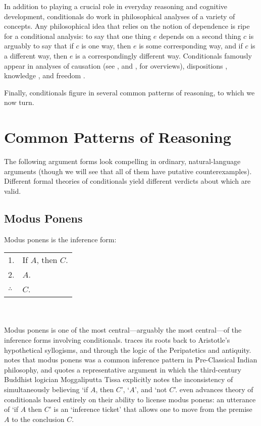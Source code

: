 In addition to playing a crucial role in everyday reasoning and cognitive development, conditionals do work in philosophical analyses of a variety of concepts.  Any philosophical idea that relies on the notion of dependence is ripe for a conditional analysis: to say that one thing $e$ depends on a second thing $c$ is arguably to say that if $c$ is one way, then $e$ is some corresponding way, and if $c$ is a different way, then $e$ is a correspondingly different way.  Conditionals famously appear in analyses of causation (see \citealp{menzies-sep}, and \citealp{Collins2004-COLCAC-2}, for overviews), dispositions \citep{prior-pargetter-jackson, choi-simple-reformed, choi-conditional-dispositions}, knowledge \citep{nozick-knowledge, sosa-moore}, and freedom \citep{moore-ethics, ayer-freedom}.

Finally, conditionals figure in several common patterns of reasoning, to which we now turn.

\section{Common Patterns of Reasoning}
\label{reasoning-patterns}

The following argument forms look compelling in ordinary, natural-language arguments (though we will see that all of them have putative counterexamples).  Different formal theories of conditionals yield different verdicts about which are valid.

\subsection{Modus Ponens}

Modus ponens is the inference form:\smallskip\\
\begin{tabular}{ll}
1. & If $A$, then $C$.\\
2. &$A$.\\
\hline
$\therefore$ & $C$.
\end{tabular}\\\smallskip\\
Modus ponens is one of the most central---arguably the most central---of the inference forms involving conditionals. \citet{Bobzien2002-BOBTDO-2} traces its roots back to Aristotle's hypothetical syllogisms, and through the logic of the Peripatetics and antiquity. \citet{sep-logic-india} notes that modus ponens was a common inference pattern in Pre-Classical Indian philosophy, and quotes a representative argument in which the third-century Buddhist logician Moggaliputta Tissa explicitly notes the inconsistency of simultaneously believing `if $A$, then $C$', `$A$', and `not $C$'.    \citet{ryle-ifsobecause} even advances theory of conditionals based entirely on their ability to license modus ponens: an utterance of `if $A$ then $C$' is an `inference ticket' that allows one to move from the premise $A$ to the conclusion $C$.

